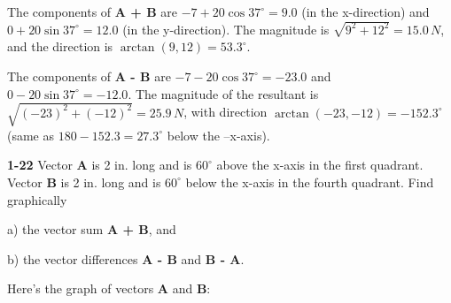\documentclass{amsart}
\begin{document}
The components of \textbf{A + B} are $-7 + 20 \cos 37^\circ = 9.0$ (in the x-direction) and $0 + 20 \sin 37^\circ = 12.0$ (in the y-direction).
The magnitude is $\sqrt{9^2 + 12^2} = 15.0\,N$, and the direction is $\arctan(9,12) = 53.3^\circ$.

The components of \textbf{A - B} are $-7 - 20 \cos 37^\circ = -23.0$ and $0 - 20 \sin 37^\circ = -12.0$.
The magnitude of the resultant is $\sqrt{(-23)^2 + (-12)^2} = 25.9\,N$, with direction $\arctan(-23, -12) = -152.3^\circ$
(same as $180 - 152.3 = 27.3^\circ$ below the --x-axis).

\textbf{1-22} Vector \textbf{A} is 2 in. long and is $60^\circ$ above the x-axis in the first quadrant.
Vector \textbf{B} is 2 in. long and is $60^\circ$ below the x-axis in the fourth quadrant.
Find graphically

a) the vector sum \textbf{A + B}, and

b) the vector differences \textbf{A - B} and \textbf{B - A}.

Here's the graph of vectors \textbf{A} and \textbf{B}:
\end{document}
